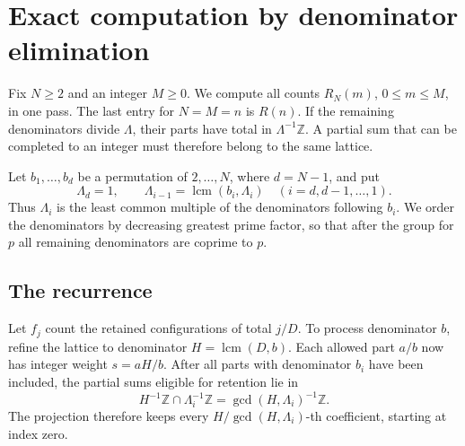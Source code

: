 \section{Exact computation by denominator elimination}
\label{sec:exact-computation}

Fix \(N\ge2\) and an integer \(M\ge0\). We compute all counts
\(R_N(m)\), \(0\le m\le M\), in one pass. The last entry for \(N=M=n\)
is \(R(n)\). If the remaining denominators divide \(\Lambda\), their
parts have total in \(\Lambda^{-1}\mathbb Z\). A partial sum that can
be completed to an integer must therefore belong to the same lattice.

Let \(b_1,\ldots,b_d\) be a permutation of \(2,\ldots,N\), where
\(d=N-1\), and put
\[
  \Lambda_d=1,\qquad
  \Lambda_{i-1}=\operatorname{lcm}(b_i,\Lambda_i)
  \quad (i=d,d-1,\ldots,1).
\]
Thus \(\Lambda_i\) is the least common multiple of the denominators
following \(b_i\). We order the denominators by decreasing greatest
prime factor, so that after the group for \(p\) all remaining
denominators are coprime to \(p\).

\subsection{The recurrence}
Let \(f_j\) count the retained configurations of total \(j/D\).
To process denominator \(b\), refine the lattice to denominator
\(H=\operatorname{lcm}(D,b)\). Each allowed part \(a/b\) now has
integer weight \(s=aH/b\). After all parts with denominator \(b_i\)
have been included, the partial sums eligible for retention lie in
\begin{equation}
  H^{-1}\mathbb Z\cap\Lambda_i^{-1}\mathbb Z
  =\gcd(H,\Lambda_i)^{-1}\mathbb Z.
  \label{eq:exact-lattice-intersection}
\end{equation}
The projection therefore keeps every \(H/\gcd(H,\Lambda_i)\)-th
coefficient, starting at index zero.

